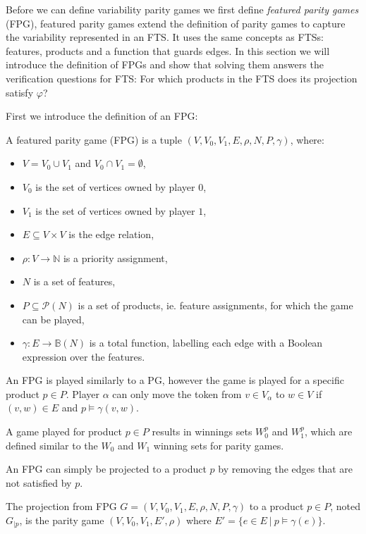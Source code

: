Before we can define variability parity games we first define \textit{featured parity games} (FPG), featured parity games extend the definition of parity games to capture the variability represented in an FTS. It uses the same concepts as FTSs: features, products and a function that guards edges. In this section we will introduce the definition of FPGs and show that solving them answers the verification questions for FTS: For which products in the FTS does its projection satisfy $\varphi$?

First we introduce the definition of an FPG:
\begin{definition}
	\label{def_FPG}
	A featured parity game (FPG) is a tuple $(V,V_0, V_1, E, \rho, N, P, \gamma)$, where:
	\begin{itemize}
		\item $V = V_0 \cup V_1$ and $V_0 \cap V_1 = \emptyset$,
		\item $V_0$ is the set of vertices owned by player $0$,
		\item $V_1$ is the set of vertices owned by player $1$, 
		\item $E \subseteq V \times V$ is the edge relation,
		\item $\rho :  V \rightarrow \mathbb{N}$ is a priority assignment,
		\item $N$ is a set of features,
		\item $P \subseteq \mathcal{P}(N)$ is a set of products, ie. feature assignments, for which the game can be played,
		\item $\gamma : E \rightarrow \mathbb{B}(N)$ is a total function, labelling each edge with a Boolean expression over the features.
	\end{itemize}
\end{definition}
An FPG is played similarly to a PG, however the game is played for a specific product $p \in P$. Player $\alpha$ can only move the token from $v \in V_\alpha$ to $w \in V$ if $(v,w) \in E$ and $p \models \gamma(v,w)$.

A game played for product $p \in P$ results in winnings sets $W_0^p$ and $W_1^p$, which are defined similar to the $W_0$ and $W_1$ winning sets for parity games.

An FPG can simply be projected to a product $p$ by removing the edges that are not satisfied by $p$.
\begin{definition}
	\label{def_FPG_proj}
The projection from FPG $G = (V,V_0, V_1, E, \rho, N, P, \gamma)$ to a product $p \in P$, noted $G_{|p}$, is the parity game $(V,V_0,V_1, E', \rho)$ where $E' = \{ e \in E\ |\ p \models \gamma(e) \}$.
\end{definition}

